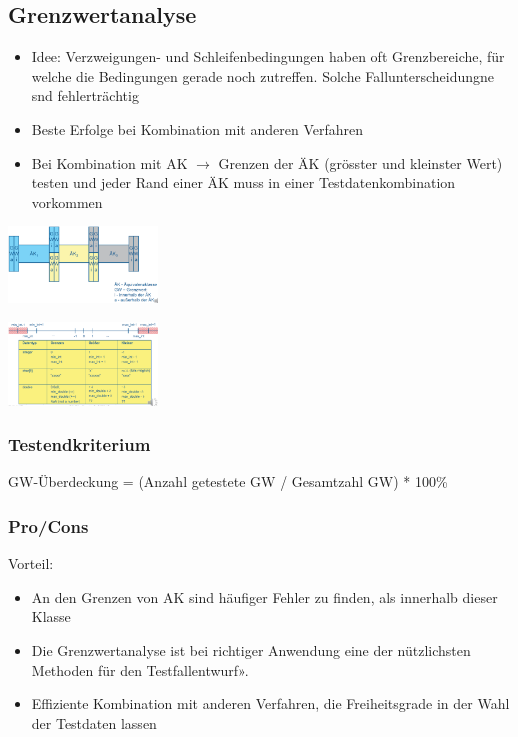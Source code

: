 \documentclass{report}
\newenvironment{Figure}
	{\par\medskip\noindent\minipage{\linewidth}}
	{\endminipage\par\medskip}
\theoremstyle{definition}
\theoremstyle{example}
\begin{document}
\subsection{Grenzwertanalyse}
\begin{itemize}
   \item Idee: Verzweigungen- und Schleifenbedingungen haben oft Grenzbereiche, für welche die Bedingungen gerade noch zutreffen. Solche Fallunterscheidungne snd fehlerträchtig
   \item Beste Erfolge bei Kombination mit anderen Verfahren
   \item Bei Kombination mit AK $\rightarrow$ Grenzen der ÄK (grösster und kleinster Wert) testen und jeder Rand einer ÄK muss in einer Testdatenkombination vorkommen
\end{itemize}

\begin{Figure}
   \centering
    \includegraphics[width=150px]{img/Grenzwertanalyse.png}
        \label{fig:Grenzwertanalyse}
    \end{Figure}

    \begin{Figure}
      \centering
       \includegraphics[width=150px]{img/BspGrenzwertanalyse.png}
           \label{fig:Beispiel Grenzwertanalyse}
       \end{Figure}

\subsubsection{Testendkriterium}
GW-Überdeckung = (Anzahl getestete GW / Gesamtzahl GW) * 100\%

\subsubsection{Pro/Cons}
Vorteil:
\begin{itemize}
   \item An den Grenzen von AK sind häufiger Fehler zu finden, als innerhalb dieser Klasse
   \item Die Grenzwertanalyse ist bei richtiger Anwendung eine der nützlichsten Methoden für den Testfallentwurf».
   \item Effiziente Kombination mit anderen Verfahren, die Freiheitsgrade in der Wahl der Testdaten lassen
\end{itemize}
\end{document}
